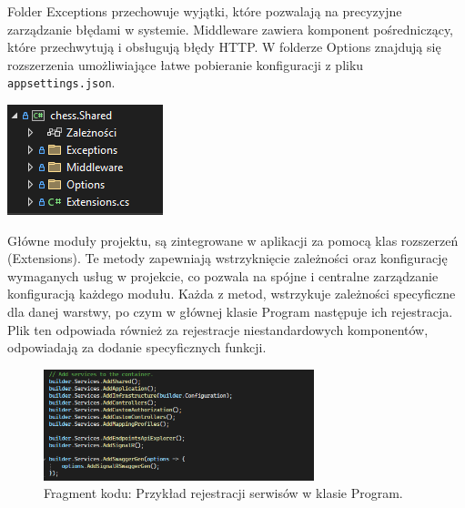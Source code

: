 \documentclass[twoside]{projektInzynierskiMS1}
\begin{document}
\vspace{0.5cm}
\noindent
\begin{minipage}[t]{0.5\textwidth}
    \vspace{0pt}
    \justifying 
    \noindent
    Folder Exceptions przechowuje wyjątki, które pozwalają na precyzyjne zarządzanie błędami w systemie. Middleware zawiera komponent pośredniczący, które przechwytują i obsługują błędy HTTP. W folderze Options znajdują się rozszerzenia umożliwiające łatwe pobieranie konfiguracji z pliku \texttt{appsettings.json}.
\end{minipage}
\hfill
\begin{minipage}[t]{0.4\textwidth}
    \vspace{0pt}
    \centering
    \includegraphics[width=\linewidth]{images/struktura_back_shared.png} 
\end{minipage}
\vspace{0.5cm}

\noindent
Główne moduły projektu, są zintegrowane w aplikacji za pomocą klas rozszerzeń (Extensions). Te metody zapewniają wstrzyknięcie zależności oraz konfigurację wymaganych usług w projekcie, co pozwala na spójne i centralne zarządzanie konfiguracją każdego modułu. Każda z metod, wstrzykuje zależności specyficzne dla danej warstwy, po czym w głównej klasie Program następuje ich rejestracja. Plik ten odpowiada również za rejestracje niestandardowych komponentów, odpowiadają za dodanie specyficznych funkcji.

\vspace{0.5cm}
\begin{figure}[h!]
    \centering
    \includegraphics[width=0.7\textwidth]{images/ex_add_services.png}
    \caption{Fragment kodu: Przykład rejestracji serwisów w klasie Program.}
\end{figure}
\end{document}
